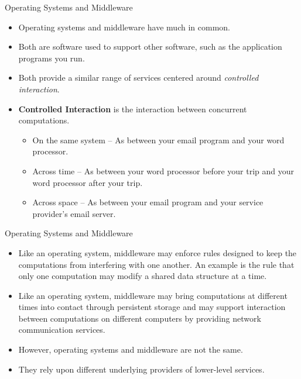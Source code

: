 \documentclass[compress,11pt,xcolor=svgnames,aspectratio=169]{beamer}
\begin{document}
\begin{frame}[fragile]{Operating Systems and Middleware}

\begin{itemize}
\setlength\itemsep{0.4cm}

  \item Operating systems and middleware have much in common.

  \item Both are software used to support other software, such as the application programs you run.

  \item Both provide a similar range of services centered around \textit{controlled interaction}.

  \item \textbf{Controlled Interaction} is the interaction between concurrent computations.\\[0.3cm]

  \begin{itemize}
  \setlength\itemsep{0.4cm}
    \item On the same system -- As between your email program and your word processor.
    \item Across time -- As between your word processor before your trip and your word processor after your trip.
    \item Across space -- As between your email program and your service provider's email server.
  \end{itemize}

\end{itemize}

\nocite{hailperin2006operating}

\end{frame}

\begin{frame}[fragile]{Operating Systems and Middleware}

\begin{itemize}
\setlength\itemsep{0.5cm}

  \item Like an operating system, middleware may enforce rules designed to keep the computations from interfering with one another. An example is the rule that only one computation may modify a shared data structure at a time.

  \item Like an operating system, middleware may bring computations at different times into contact through persistent storage and may support interaction between computations on different computers by providing network communication services.

  \item However, operating systems and middleware are not the same.

  \item They rely upon different underlying providers of lower-level services.

\end{itemize}

\nocite{hailperin2006operating}

\end{frame}
\end{document}
